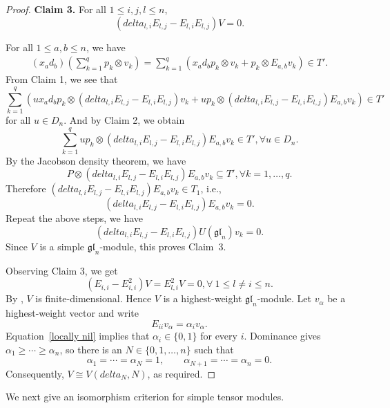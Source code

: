 \documentclass[12pt,a4paper]{amsart}
\def\gl{gl}%
\def\delta{delta}%
\numberwithin{equation}{section}
\def\gl{\mathfrak{gl}}
\begin{document}
\begin{proof}
\smallskip
\noindent\textbf{Claim 3.}
For all \(1\leq i,j,l\leq n\),
\[
(\delta_{l,i}E_{l,j}-E_{l,i}E_{l,j})V=0.
\]

For all $1\leq a,b \leq n$, we have
\begin{align*}
(x_ad_b)(\sum^q_{k=1}p_k\otimes v_k)=\sum^q_{k=1}(x_ad_bp_k\otimes v_k + p_k\otimes E_{a,b}v_k)\in T'.
\end{align*}
From Claim 1, we see that
$$\sum^q_{k=1}(ux_ad_bp_k\otimes (\delta_{l,i}E_{l,j}-E_{l,i}E_{l,j})v_k + up_k\otimes (\delta_{l,i}E_{l,j}-E_{l,i}E_{l,j})E_{a,b}v_k)\in T'$$
for all $u\in D_n$. And by Claim 2, we obtain
$$\sum^q_{k=1}up_k\otimes (\delta_{l,i}E_{l,j}-E_{l,i}E_{l,j})E_{a,b}v_k\in T', \forall u\in D_n.$$
By the Jacobson density theorem, we have
$$P\otimes (\delta_{l,i}E_{l,j}-E_{l,i}E_{l,j})E_{a,b}v_k \subseteq T', \forall k=1,\dots,q.$$
Therefore $(\delta_{l,i}E_{l,j}-E_{l,i}E_{l,j})E_{a,b}v_k\in T_1$, i.e.,
$$(\delta_{l,i}E_{l,j}-E_{l,i}E_{l,j})E_{a,b}v_k=0.$$
Repeat the above steps, we have
$$(\delta_{l,i}E_{l,j}-E_{l,i}E_{l,j})U(\gl_n)v_k=0.$$
Since \(V\) is a simple \(\gl_n\)-module, this proves Claim~3.

Observing Claim 3, we get
\begin{equation}\label{locally nil}
(E_{i,i}-E_{i,i}^2)V=E_{l,i}^2V=0, \forall \ 1\leq l\neq i\leq n.
\end{equation}
By \cite[Lemma~2.4(2)]{LZ}, \(V\) is finite-dimensional. Hence \(V\)
is a highest-weight \(\gl_n\)-module. Let \(v_\alpha\) be a
highest-weight vector and write
\[
E_{ii}v_\alpha=\alpha_i v_\alpha.
\]
Equation~\eqref{locally nil} implies that
\(\alpha_i\in\{0,1\}\) for every \(i\). Dominance gives
\(\alpha_1\geq\cdots\geq\alpha_n\), so there is an
\(N\in\{0,1,\ldots,n\}\) such that
\[
\alpha_1=\cdots=\alpha_N=1,
\qquad
\alpha_{N+1}=\cdots=\alpha_n=0.
\]
Consequently,
$V\cong V(\delta_N,N)$,
as required.
\end{proof}

We next give an isomorphism criterion for simple tensor modules.
\end{document}
